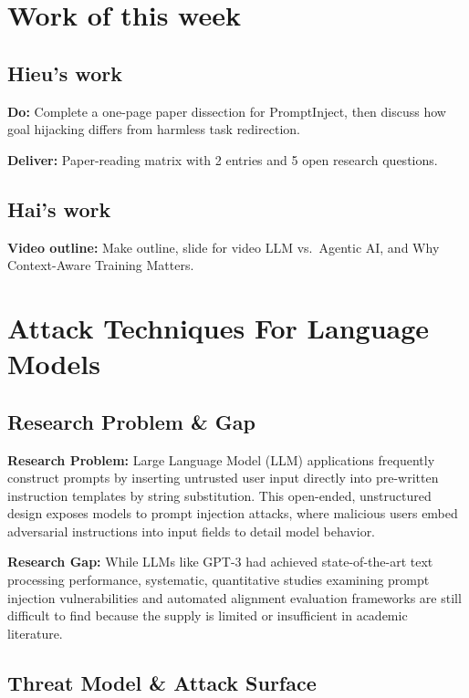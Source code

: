 \documentclass[a4paper,12pt]{report}
\begin{document}
\newpage
\chapter{Work of this week}

\section{Hieu's work}

\textbf{Do:} Complete a one-page paper dissection for PromptInject, then discuss how goal hijacking differs from harmless task redirection.

\textbf{Deliver:} Paper-reading matrix with 2 entries and 5 open research questions.

\section{Hai's work}

\textbf{Video outline:} Make outline, slide for video LLM vs.\ Agentic AI, and Why Context-Aware Training Matters.

\chapter[R1: Ignore Previous Prompt]{Attack Techniques For Language Models}
 
\section*{Research Problem \& Gap}
 
\textbf{Research Problem:} Large Language Model (LLM) applications frequently construct prompts by inserting untrusted user input directly into pre-written instruction templates by string substitution. This open-ended, unstructured design exposes models to prompt injection attacks, where malicious users embed adversarial instructions into input fields to detail model behavior.
 
\textbf{Research Gap:} While LLMs like GPT-3 had achieved state-of-the-art text processing performance, systematic, quantitative studies examining prompt injection vulnerabilities and automated alignment evaluation frameworks are still difficult to find because the supply is limited or insufficient in academic literature.
 
\section*{Threat Model \& Attack Surface}
 
\end{document}
